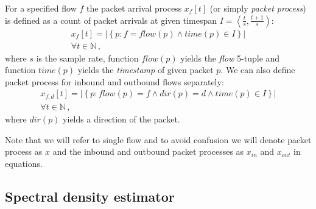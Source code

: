 For a specified flow $f$ the packet arrival process $x_f\left[t\right]$ 
(or simply \emph{packet process})  is defined as a count of packet arrivals 
at given timespan $I = \left\langle \frac{t}{s}, \frac{t+1}{s} \right)$:
\begin{equation}\label{packetprocess}
\begin{split}
	 x_f\left[t\right] = \left| 
	\left\lbrace p : f = flow(p) \wedge time(p) \in I \right\rbrace \right|\\
	\forall t \in \mathbb{N}\, ,
\end{split}
\end{equation}
where $s$ is the sample rate, function $flow(p)$  yields the \emph{flow} 5-tuple 
and function $time(p)$  yields the \emph{timestamp} of given packet $p$. 
We can also define packet process for inbound and outbound flows separately:
\begin{equation}\label{xpacketprocess}
\begin{split}
  x_{f,d}\left[t\right] = \left| 
  \left\lbrace p : flow(p) = f \wedge dir(p) = d \wedge time(p) \in I  \right\rbrace \right|\\
  \forall t \in \mathbb{N}\, ,
\end{split}
\end{equation}%
where $dir(p)$ yields a direction of the packet. 

Note that we will refer to single flow and to avoid confusion
we will denote packet process as $x$ and the inbound and
outbound packet processes as $x_{in}$ and $x_{out}$  in equations. 


\subsection{Spectral density estimator}\label{sec:psd}

